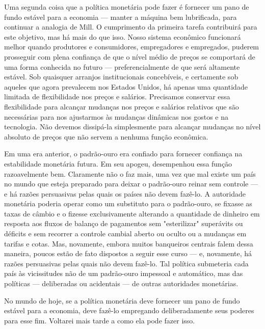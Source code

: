 \documentclass[12pt]{article}
\begin{document}
Uma segunda coisa que a política monetária pode fazer é fornecer um pano de fundo estável para a economia — manter a máquina bem lubrificada, para continuar a analogia de Mill. O cumprimento da primeira tarefa contribuirá para este objetivo, mas há mais do que isso. Nosso sistema econômico funcionará melhor quando produtores e consumidores, empregadores e empregados, puderem prosseguir com plena confiança de que o nível médio de preços se comportará de uma forma conhecida no futuro — preferencialmente de que será altamente estável. Sob quaisquer arranjos institucionais concebíveis, e certamente sob aqueles que agora prevalecem nos Estados Unidos, há apenas uma quantidade limitada de flexibilidade nos preços e salários. Precisamos conservar essa flexibilidade para alcançar mudanças nos preços e salários relativos que são necessárias para nos ajustarmos às mudanças dinâmicas nos gostos e na tecnologia. Não devemos dissipá-la simplesmente para alcançar mudanças no nível absoluto de preços que não servem a nenhuma função econômica.

Em uma era anterior, o padrão-ouro era confiado para fornecer confiança na estabilidade monetária futura. Em seu apogeu, desempenhou essa função razoavelmente bem. Claramente não o faz mais, uma vez que mal existe um país no mundo que esteja preparado para deixar o padrão-ouro reinar sem controle — e há razões persuasivas pelas quais os países não devem fazê-lo. A autoridade monetária poderia operar como um substituto para o padrão-ouro, se fixasse as taxas de câmbio e o fizesse exclusivamente alterando a quantidade de dinheiro em resposta aos fluxos de balanço de pagamentos sem "esterilizar" superávits ou déficits e sem recorrer a controle cambial aberto ou oculto ou a mudanças em tarifas e cotas. Mas, novamente, embora muitos banqueiros centrais falem dessa maneira, poucos estão de fato dispostos a seguir esse curso — e, novamente, há razões persuasivas pelas quais não devem fazê-lo. Tal política submeteria cada país às vicissitudes não de um padrão-ouro impessoal e automático, mas das políticas — deliberadas ou acidentais — de outras autoridades monetárias.

No mundo de hoje, se a política monetária deve fornecer um pano de fundo estável para a economia, deve fazê-lo empregando deliberadamente seus poderes para esse fim. Voltarei mais tarde a como ela pode fazer isso.
\end{document}
